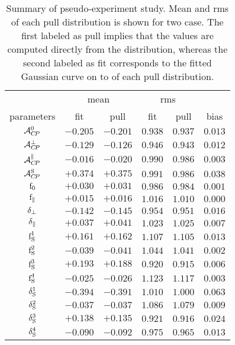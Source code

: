 \begin{table}[!h]
  \centering
  \footnotesize
  \begin{tabular}{c c c c c | c}
    \cline{2-5}
               & \multicolumn{2}{c}{mean} & \multicolumn{2}{c}{rms} &  \\
    \cline{2-6}
    parameters & fit & pull & fit & pull & bias \\
    \cline{1-6}
    $                  \mathcal{A}_{C\!P}^{0}$ & $-0.205$ & $-0.201$ & $0.938$ & $0.937$  & $0.013$ \\
    $              \mathcal{A}_{C\!P}^{\perp}$ & $-0.129$ & $-0.126$ & $0.946$ & $0.943$  & $0.012$ \\
    $          \mathcal{A}_{C\!P}^{\parallel}$ & $-0.016$ & $-0.020$ & $0.990$ & $0.986$  & $0.003$ \\
    $                  \mathcal{A}_{C\!P}^{\rm S}$ & $+0.374$ & $+0.375$ & $0.991$ & $0.986$  & $0.038$ \\
    \hline
    $                   \text{f}_{0}$ & $+0.030$ & $+0.031$ & $0.986$ & $0.984$  & $0.001$ \\
    $           \text{f}_{\parallel}$ & $+0.015$ & $+0.016$ & $1.016$ & $1.010$  & $0.000$ \\
    $         \delta_{\perp}$ & $-0.142$ & $-0.145$ & $0.954$ & $0.951$  & $0.016$ \\
    $     \delta_{\parallel}$ & $+0.037$ & $+0.041$ & $1.023$ & $1.025$  & $0.007$ \\
    \hline
    $                   \text{f}_{\text{S}}^{1}$ & $+0.161$ & $+0.162$ & $1.107$ & $1.105$  & $0.013$ \\
    $                   \text{f}_{\text{S}}^{2}$ & $-0.039$ & $-0.041$ & $1.044$ & $1.041$  & $0.002$ \\
    $                   \text{f}_{\text{S}}^{3}$ & $+0.193$ & $+0.188$ & $0.920$ & $0.915$  & $0.006$ \\
    $                   \text{f}_{\text{S}}^{4}$ & $-0.025$ & $-0.026$ & $1.123$ & $1.117$  & $0.003$ \\
    $               \delta_{\text{S}}^{1}$ & $-0.394$ & $-0.391$ & $1.010$ & $1.000$  & $0.063$ \\
    $               \delta_{\text{S}}^{2}$ & $-0.037$ & $-0.037$ & $1.086$ & $1.079$  & $0.009$ \\
    $               \delta_{\text{S}}^{3}$ & $+0.138$ & $+0.135$ & $0.921$ & $0.916$  & $0.024$ \\
    $               \delta_{\text{S}}^{4}$ & $-0.090$ & $-0.092$ & $0.975$ & $0.965$  & $0.013$ \\
  \end{tabular}
  \caption{Summary of pseudo-experiment study. Mean and rms of each pull distribution is shown for two case.
           The first labeled as pull implies that the values are computed directly from the distribution,
           whereas the second labeled as fit corresponds to the fitted Gaussian curve on to of each pull distribution.}
  \label{pull_table}
\end{table}
